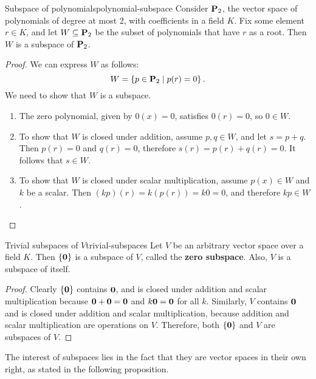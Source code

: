 \begin{example}{Subspace of polynomials}{polynomial-subspace}
  Consider $\mathbf{P}_2$, the vector space of polynomials of degree at
  most 2, with coefficients in a field $K$. Fix some element $r\in K$,
  and let $W \subseteq \mathbf{P}_2$ be the subset of polynomials that have
  $r$ as a root. Then $W$ is a subspace of $\mathbf{P}_2$.
\end{example}

\begin{proof}
  We can express $W$ as follows:
  \begin{equation*}
    W = \left\{p\in\mathbf{P}_2 \mid p(r)  = 0\right\}.
  \end{equation*}
  We need to show that $W$ is a subspace.
  \begin{enumerate}
  \item The zero polynomial, given by $0(x)=0$, satisfies $0(r)=0$, so
    $0\in W$.
  \item To show that $W$ is closed under addition, assume
    $p, q\in W$, and let $s=p+q$. Then $p(r)=0$ and $q(r)=0$,
    therefore $s(r) = p(r)+q(r) = 0$. It follows that $s\in W$.
  \item To show that $W$ is closed under scalar multiplication, assume
    $p(x)\in W$ and $k$ be a scalar. Then $(kp)(r)=k(p(r))=k0=0$, and
    therefore $kp\in W$.
  \end{enumerate}
\end{proof}

\begin{example}{Trivial subspaces of\/ $V$}{trivial-subspaces}
  Let $V$ be an arbitrary vector space over a field $K$. Then
  $\set{\vect{0}}$ is a subspace of\/ $V$, called the \textbf{zero
    subspace}. Also, $V$ is a subspace of itself.
\end{example}

\begin{proof}
  Clearly $\set{\vect{0}}$ contains $\vect{0}$, and is closed under
  addition and scalar multiplication because
  $\vect{0}+\vect{0}=\vect{0}$ and $k\vect{0}=\vect{0}$ for all $k$.
  Similarly, $V$ contains $\vect{0}$ and is closed under addition and
  scalar multiplication, because addition and scalar multiplication
  are operations on $V$.  Therefore, both $\set{\vect{0}}$ and $V$ are
  subspaces of\/ $V$.
\end{proof}

The interest of subspaces lies in the fact that they are vector spaces
in their own right, as stated in the following proposition.


